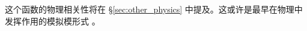 \begin{itemize}
{%

这个函数的物理相关性将在 \S\ref{sec:other_physics} 中提及。这或许是最早在物理中发挥作用的模拟模形式 \cite{MR1285785,Vafa:1994tf}。
}
\end{itemize}
